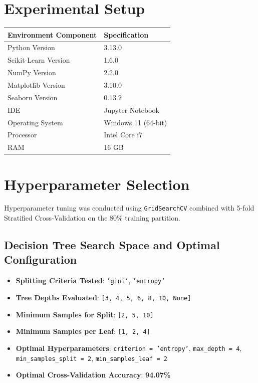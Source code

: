 \documentclass[12pt,a4paper]{article}
\begin{document}
\section{Experimental Setup}

\begin{tabular}{ll}
\toprule
\textbf{Environment Component} & \textbf{Specification} \\
\midrule
Python Version & 3.13.0 \\
Scikit-Learn Version & 1.6.0 \\
NumPy Version & 2.2.0 \\
Matplotlib Version & 3.10.0 \\
Seaborn Version & 0.13.2 \\
IDE & Jupyter Notebook \\
Operating System & Windows 11 (64-bit) \\
Processor & Intel Core i7 \\
RAM & 16 GB \\
\bottomrule
\end{tabular}

\section{Hyperparameter Selection}

Hyperparameter tuning was conducted using \texttt{GridSearchCV} combined with 5-fold Stratified Cross-Validation on the 80\% training partition.

\subsection*{Decision Tree Search Space and Optimal Configuration}
\begin{itemize}
\item \textbf{Splitting Criteria Tested}: \texttt{'gini'}, \texttt{'entropy'}
\item \textbf{Tree Depths Evaluated}: \texttt{[3, 4, 5, 6, 8, 10, None]}
\item \textbf{Minimum Samples for Split}: \texttt{[2, 5, 10]}
\item \textbf{Minimum Samples per Leaf}: \texttt{[1, 2, 4]}
\item \textbf{Optimal Hyperparameters}: \texttt{criterion = 'entropy'}, \texttt{max\_depth = 4}, \texttt{min\_samples\_split = 2}, \texttt{min\_samples\_leaf = 2}
\item \textbf{Optimal Cross-Validation Accuracy}: \textbf{94.07\%}
\end{itemize}
\end{document}
